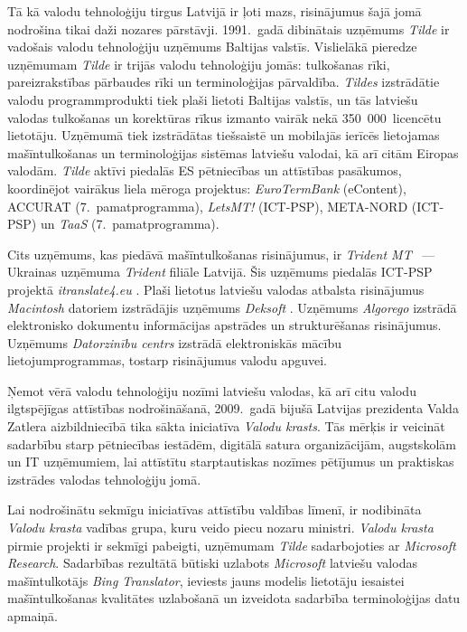 \begin{multicols}{2}
Tā kā valodu tehnoloģiju tirgus Latvijā ir ļoti mazs, risinājumus šajā jomā nodrošina tikai daži nozares pārstāvji.  1991.~gadā dibinātais uzņēmums \textit{Tilde} \cite{Meta41} ir vadošais valodu tehnoloģiju uzņēmums Baltijas valstīs.  Vislielākā pieredze uzņēmumam \textit{Tilde} ir trijās valodu tehnoloģiju jomās: tulkošanas rīki, pareizrakstības pārbaudes rīki un terminoloģijas pārvaldība.  \textit{Tildes} izstrādātie valodu programmprodukti tiek plaši lietoti Baltijas valstīs, un tās latviešu valodas tulkošanas un korektūras rīkus izmanto vairāk nekā 350~000~licencētu lietotāju.  Uzņēmumā tiek izstrādātas tiešsaistē un mobilajās ierīcēs lietojamas mašīntulkošanas un terminoloģijas sistēmas latviešu valodai, kā arī citām Eiropas valodām.  \textit{Tilde} aktīvi piedalās ES pētniecības un attīstības pasākumos, koordinējot vairākus liela mēroga projektus: \textit{EuroTermBank} (eContent), ACCURAT (7.~pamatpro\-gramma), \textit{LetsMT!} (ICT-PSP), META-NORD (ICT-PSP) un \textit{TaaS} (7.~pamatprogramma).

Cits uzņēmums, kas piedāvā mašīntulkošanas risinājumus, ir \textit{Trident MT} \cite{Meta42}~--- Ukrainas uzņēmuma \textit{Trident} filiāle Latvijā.  Šis uzņēmums piedalās ICT-PSP projektā \textit{itranslate4.eu} \cite{Meta43}.  Plaši lietotus latviešu valodas atbalsta risinājumus \textit{Macintosh} datoriem \mbox{izstrādājis} uzņēmums \textit{Deksoft} \cite{MetaRef1}.  Uzņēmums \textit{Algorego} \cite{Meta44} \mbox{izstrādā} elektronisko dokumentu informācijas apstrādes un strukturēšanas risinājumus.  Uzņēmums \textit{Datorzinību centrs} \cite{Meta45} izstrādā elektroniskās mācību lietojumprogrammas, tostarp risinājumus valodu apguvei.

Ņemot vērā valodu tehnoloģiju nozīmi latviešu valodas, kā arī citu valodu ilgtspējīgas attīstības nodrošināšanā, 2009.~gadā bijušā Latvijas prezidenta Valda Zatlera aizbildniecībā tika sākta iniciatīva \textit{Valodu krasts}.  Tās mērķis ir veicināt sadarbību starp pētniecības iestādēm, digitālā satura organizācijām, augstskolām un IT uzņēmumiem, lai attīstītu starp\-tautiskas nozīmes pētījumus un praktiskas izstrādes valodas tehnoloģiju jomā.

Lai nodrošinātu sekmīgu iniciatīvas attīstību valdības līmenī, ir nodibināta \textit{Valodu krasta} vadības grupa, kuru veido piecu nozaru ministri.
\textit{Valodu krasta} pirmie projekti ir sekmīgi pabeigti, uzņēmumam \textit{Tilde} sadarbojoties ar \textit{Microsoft Research}.
Sadarbības rezultātā būtiski uzlabots \textit{Microsoft} latviešu valodas mašīntulkotājs \textit{Bing Translator}, ieviests jauns modelis lietotāju iesaistei mašīntulkošanas kvalitātes uzlabošanā un izveidota sadarbība terminoloģijas datu apmaiņā. 


\end{multicols}
